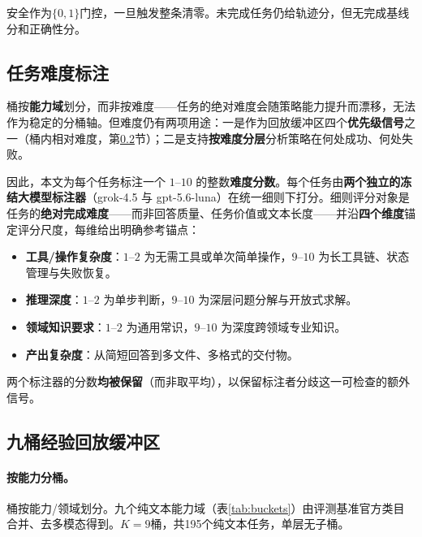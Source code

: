 安全作为$\{0,1\}$门控，一旦触发整条清零。未完成任务仍给轨迹分，但无完成基线分和正确性分。

\subsection{任务难度标注}
\label{sec:difficulty}

桶按\textbf{能力域}划分，而非按难度——任务的绝对难度会随策略能力提升而漂移，无法作为稳定的分桶轴。但难度仍有两项用途：一是作为回放缓冲区四个\textbf{优先级信号}之一（桶内相对难度，第\ref{sec:buffer}节）；二是支持\textbf{按难度分层}分析策略在何处成功、何处失败。

因此，本文为每个任务标注一个 $1$--$10$ 的整数\textbf{难度分数}。每个任务由\textbf{两个独立的冻结大模型标注器}（grok-4.5 与 gpt-5.6-luna）在统一细则下打分。细则评分对象是任务的\textbf{绝对完成难度}——而非回答质量、任务价值或文本长度——并沿\textbf{四个维度}锚定评分尺度，每维给出明确参考锚点：

\begin{itemize}
  \item \textbf{工具/操作复杂度}：$1$--$2$ 为无需工具或单次简单操作，$9$--$10$ 为长工具链、状态管理与失败恢复。
  \item \textbf{推理深度}：$1$--$2$ 为单步判断，$9$--$10$ 为深层问题分解与开放式求解。
  \item \textbf{领域知识要求}：$1$--$2$ 为通用常识，$9$--$10$ 为深度跨领域专业知识。
  \item \textbf{产出复杂度}：从简短回答到多文件、多格式的交付物。
\end{itemize}

两个标注器的分数\textbf{均被保留}（而非取平均），以保留标注者分歧这一可检查的额外信号。

\subsection{九桶经验回放缓冲区}
\label{sec:buffer}

\paragraph{按能力分桶。}桶按能力/领域划分。九个纯文本能力域（表\ref{tab:buckets}）由评测基准官方类目合并、去多模态得到。$K=9$桶，共195个纯文本任务，单层无子桶。

